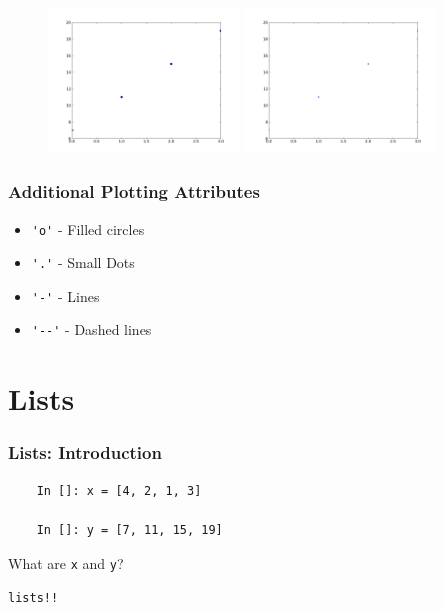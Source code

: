 \documentclass[14pt,compress]{beamer}
\newcommand{\typ}[1]{\lstinline{#1}}
\begin{document}
\begin{frame}[fragile]
\begin{figure}
\includegraphics[width=2in]{data/stline_dots.png}
\includegraphics[width=2in]{data/stline_points.png}
\end{figure}
\end{frame}

\begin{frame}[fragile]
\frametitle{Additional Plotting Attributes}
\begin{itemize}
  \item \typ{'o'} - Filled circles
  \item \typ{'.'} - Small Dots
  \item \typ{'-'} - Lines
  \item \typ{'--'} - Dashed lines
\end{itemize}
\end{frame}

\section{Lists}
\begin{frame}[fragile]
  \frametitle{Lists: Introduction}
  \begin{lstlisting}
    In []: x = [4, 2, 1, 3]

    In []: y = [7, 11, 15, 19]

  \end{lstlisting}
What are \typ{x} and \typ{y}?\\
\begin{center}
\alert{\typ{lists!!}}
\end{center}
\end{frame}
\end{document}
